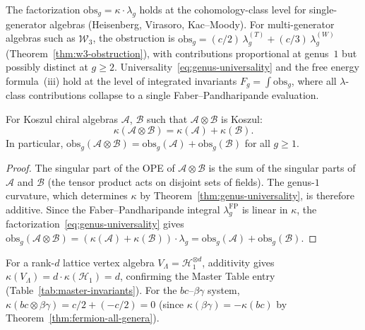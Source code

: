 \begin{remark}\label{rem:lambda-universality}
The factorization $\mathrm{obs}_g = \kappa \cdot \lambda_g$ holds at the cohomology-class level for single-generator algebras (Heisenberg, Virasoro, Kac--Moody).  For multi-generator algebras such as $\mathcal{W}_3$,
the obstruction is $\mathrm{obs}_g = (c/2)\,\lambda_g^{(T)} + (c/3)\,\lambda_g^{(W)}$
(Theorem~\ref{thm:w3-obstruction}), with contributions proportional at genus~$1$ but possibly distinct at $g \geq 2$.
Universality~\eqref{eq:genus-universality} and the free energy formula~(iii) hold at the level of integrated invariants $F_g = \int \mathrm{obs}_g$, where all $\lambda$-class contributions collapse to a single Faber--Pandharipande evaluation.
\end{remark}

\begin{corollary}\label{cor:kappa-additivity}
For Koszul chiral algebras $\mathcal{A}$, $\mathcal{B}$ such that $\mathcal{A} \otimes \mathcal{B}$ is Koszul:
\begin{equation}\label{eq:kappa-additivity}
\kappa(\mathcal{A} \otimes \mathcal{B}) = \kappa(\mathcal{A}) + \kappa(\mathcal{B}).
\end{equation}
In particular, $\mathrm{obs}_g(\mathcal{A} \otimes \mathcal{B}) = \mathrm{obs}_g(\mathcal{A}) + \mathrm{obs}_g(\mathcal{B})$ for all $g \geq 1$.
\end{corollary}

\begin{proof}
The singular part of the OPE of $\mathcal{A} \otimes \mathcal{B}$ is the sum of the singular parts of $\mathcal{A}$ and $\mathcal{B}$ (the tensor product acts on disjoint sets of fields).  The genus-$1$ curvature, which determines $\kappa$ by Theorem~\ref{thm:genus-universality}, is therefore additive.  Since the Faber--Pandharipande integral $\lambda_g^{\mathrm{FP}}$ is linear in $\kappa$, the factorization~\eqref{eq:genus-universality} gives $\mathrm{obs}_g(\mathcal{A} \otimes \mathcal{B}) = (\kappa(\mathcal{A}) + \kappa(\mathcal{B})) \cdot \lambda_g = \mathrm{obs}_g(\mathcal{A}) + \mathrm{obs}_g(\mathcal{B})$.
\end{proof}

\begin{example}
For a rank-$d$ lattice vertex algebra $V_\Lambda = \mathcal{H}_1^{\otimes d}$, additivity gives $\kappa(V_\Lambda) = d \cdot \kappa(\mathcal{H}_1) = d$, confirming the Master Table entry (Table~\ref{tab:master-invariants}).  For the $bc$--$\beta\gamma$ system, $\kappa(bc \otimes \beta\gamma) = c/2 + (-c/2) = 0$ (since $\kappa(\beta\gamma) = -\kappa(bc)$ by Theorem~\ref{thm:fermion-all-genera}).
\end{example}

